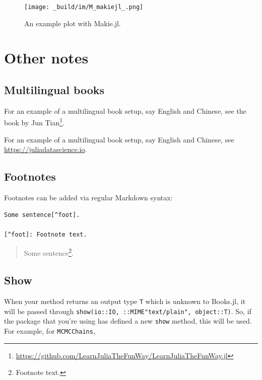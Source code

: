 \documentclass[
  notoc %
]{tufte-book}
\DeclareRobustCommand{\href}[2]{#2\footnote{\url{#1}}}
\newcommand{\passthrough}[1]{#1}
\begin{document}
\begin{figure}
\hypertarget{fig:makie}{%
\centering
\texttt{[image: \_build/im/M\_makiejl\_.png]}
\caption{An example plot with Makie.jl.}\label{fig:makie}
}
\end{figure}

\hypertarget{other-notes}{%
\section{Other notes}\label{other-notes}}

\hypertarget{multilingual-books}{%
\subsection{Multilingual books}\label{multilingual-books}}

For an example of a multilingual book setup, say English and Chinese,
see the book by
\href{https://github.com/LearnJuliaTheFunWay/LearnJuliaTheFunWay.jl}{Jun
Tian}.

For an example of a multilingual book setup, say English and Chinese,
see \url{https://juliadatascience.io}.

\hypertarget{footnotes}{%
\subsection{Footnotes}\label{footnotes}}

Footnotes can be added via regular Markdown syntax:

\begin{lstlisting}
Some sentence[^foot].

[^foot]: Footnote text.
\end{lstlisting}

\begin{quote}
Some sentence\footnote{Footnote text.}.
\end{quote}

\hypertarget{show}{%
\subsection{Show}\label{show}}

When your method returns an output type \passthrough{\lstinline!T!}
which is unknown to Books.jl, it will be passed through
\passthrough{\lstinline!show(io::IO, ::MIME"text/plain", object::T)!}.
So, if the package that you're using has defined a new
\passthrough{\lstinline!show!} method, this will be used. For example,
for \passthrough{\lstinline!MCMCChains!},
\end{document}
